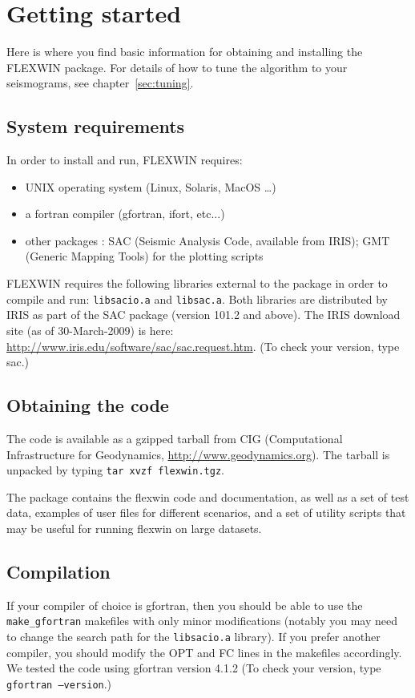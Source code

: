 \chapter{Getting started\label{sec:install}}

Here is where you find basic information for obtaining and installing the FLEXWIN package.
For details of how to tune the algorithm to your seismograms, see chapter~\ref{sec:tuning}.

\section{System requirements}
In order to install and run, FLEXWIN requires:
\begin{itemize}
\item UNIX operating system (Linux, Solaris, MacOS \ldots)
\item a fortran compiler (gfortran, ifort, etc...) 
\item other packages : SAC (Seismic Analysis Code, available from IRIS); GMT (Generic Mapping Tools) for the plotting scripts
\end{itemize}

FLEXWIN requires the following libraries external to the package in order to
compile and run: {\tt libsacio.a} and {\tt libsac.a}. Both libraries
are distributed by IRIS as part of the SAC package (version 101.2 and above).
The IRIS download site (as of 30-March-2009) is here:
\url{http://www.iris.edu/software/sac/sac.request.htm}.
(To check your version, type sac.)


\section{Obtaining the code}

The code is available as a gzipped tarball from CIG (Computational Infrastructure for Geodynamics, \url{http://www.geodynamics.org}). The tarball is unpacked by typing {\tt tar xvzf flexwin.tgz}.

The package contains the flexwin code and documentation, as well as a set of
test data, examples of user files for different scenarios, and a set of utility
scripts that may be useful for running flexwin on large datasets.


\section{Compilation}

If your compiler of choice is gfortran, then you should be able to use the
{\tt make\_gfortran} makefiles with only minor modifications (notably you may need to
change the search path for the {\tt libsacio.a} library).  If you prefer another
compiler, you should modify the OPT and FC lines in the makefiles accordingly. We tested the code using gfortran version 4.1.2
(To check your version, type {\tt gfortran --version}.)  

